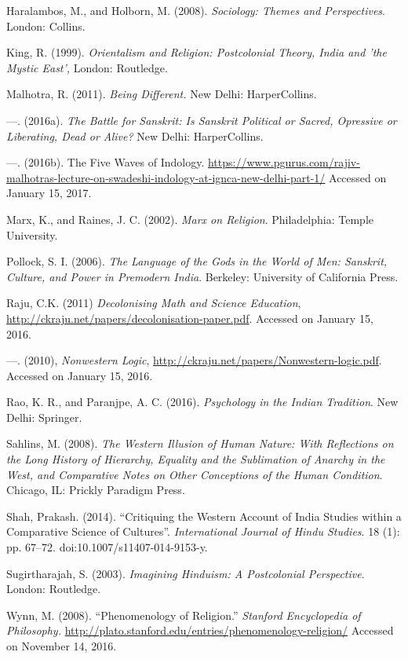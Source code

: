 \begin{thebibliography}{99}
  Haralambos, M., and Holborn, M. (2008). \textit{Sociology: Themes and Perspectives}. London: Collins.

  King, R. (1999). \textit{Orientalism and Religion: Postcolonial Theory, India and 'the Mystic East',} London: Routledge.

  Malhotra, R. (2011). \textit{Being Different.} New Delhi: HarperCollins.

  —. (2016a). \textit{The Battle for Sanskrit: Is Sanskrit Political or Sacred, Opressive or Liberating, Dead or Alive? } New Delhi: HarperCollins.

  —. (2016b). The Five Waves of Indology. \url{https://www.pgurus.com/rajiv-malhotras-lecture-on-swadeshi-indology-at-ignca-new-delhi-part-1/} Accessed on January 15, 2017.

  Marx, K., and Raines, J. C. (2002). \textit{Marx on Religion}. Philadelphia: Temple University.

  Pollock, S. I. (2006). \textit{The Language of the Gods in the World of Men: Sanskrit, Culture, and Power in Premodern India}. Berkeley: University of California Press.

  Raju, C.K. (2011) \textit{Decolonising Math and Science Education}, \url{http://ckraju.net/papers/decolonisation-paper.pdf}. Accessed on January 15, 2016.

  —. (2010), \textit{Nonwestern Logic}, \url{http://ckraju.net/papers/Nonwestern-logic.pdf}. Accessed on January 15, 2016.

  Rao, K. R., and Paranjpe, A. C. (2016). \textit{Psychology in the Indian Tradition}. New Delhi: Springer.

  Sahlins, M. (2008). \textit{The Western Illusion of Human Nature: With Reflections on the Long History of Hierarchy, Equality and the Sublimation of Anarchy in the West, and Comparative Notes on Other Conceptions of the Human Condition}. Chicago, IL: Prickly Paradigm Press.

  Shah, Prakash. (2014). “Critiquing the Western Account of India Studies within a Comparative Science of Cultures”. \textit{International Journal of Hindu Studies}. 18 (1): pp. 67–72. doi:10.1007/s11407-014-9153-y.

  Sugirtharajah, S. (2003). \textit{Imagining Hinduism: A Postcolonial Perspective}. London: Routledge.

  Wynn, M. (2008). “Phenomenology of Religion.” \textit{Stanford Encyclopedia of Philosophy.} \url{http://plato.stanford.edu/entries/phenomenology-religion/} Accessed on November 14, 2016.

 \end{thebibliography}

